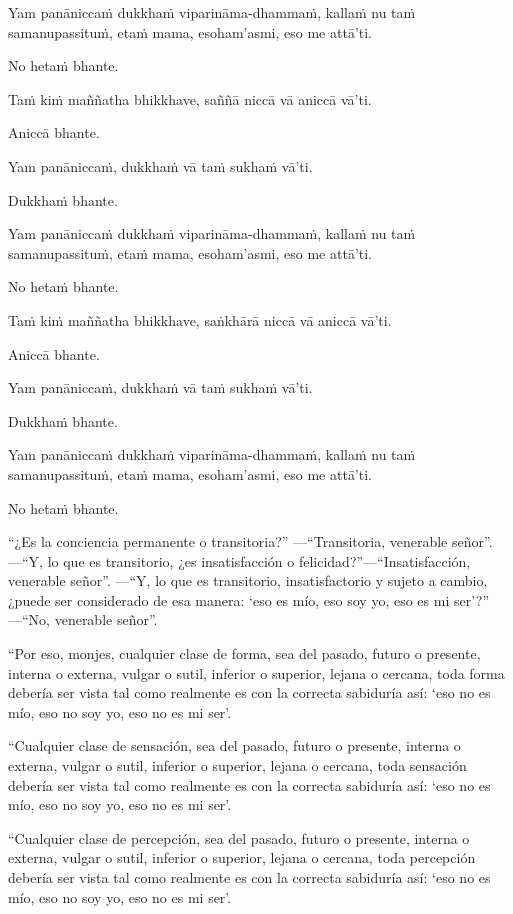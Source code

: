 Yam panāniccaṁ dukkhaṁ viparināma-dhammaṁ, kallaṁ nu taṁ samanupassituṁ,
etaṁ mama, esoham'asmi, eso me attā'ti.

No hetaṁ bhante.

Taṁ kiṁ maññatha bhikkhave, saññā niccā vā aniccā vā'ti.

Aniccā bhante.

Yam panāniccaṁ, dukkhaṁ vā taṁ sukhaṁ vā'ti.

Dukkhaṁ bhante.

Yam panāniccaṁ dukkhaṁ viparināma-dhammaṁ, kallaṁ nu taṁ samanupassituṁ,
etaṁ mama, esoham'asmi, eso me attā'ti.

No hetaṁ bhante.

Taṁ kiṁ maññatha bhikkhave, saṅkhārā niccā vā aniccā vā'ti.

Aniccā bhante.

Yam panāniccaṁ, dukkhaṁ vā taṁ sukhaṁ vā'ti.

Dukkhaṁ bhante.

Yam panāniccaṁ dukkhaṁ viparināma-dhammaṁ, kallaṁ nu taṁ samanupassituṁ,
etaṁ mama, esoham'asmi, eso me attā'ti.

No hetaṁ bhante.

\clearpage

\englishText
\markboth{\englishTitle}{\rightmark}

“¿Es la conciencia permanente o transitoria?”
—“Transitoria, venerable señor”.
—“Y, lo que es transitorio, ¿es insatisfacción o felicidad?”—“Insatisfacción, venerable señor”.
—“Y, lo que es transitorio, insatisfactorio y sujeto a cambio, ¿puede ser considerado de esa manera: ‘eso es mío, eso soy yo, eso es mi ser’?”
—“No, venerable señor”.

“Por eso, monjes, cualquier clase de forma, sea del pasado, futuro o presente, interna o externa, vulgar o sutil, inferior o superior, lejana o cercana, toda forma debería ser vista tal como realmente es con la correcta sabiduría así: ‘eso no es mío, eso no soy yo, eso no es mi ser’.

“Cualquier clase de sensación, sea del pasado, futuro o presente, interna o externa, vulgar o sutil, inferior o superior, lejana o cercana, toda sensación debería ser vista tal como realmente es con la correcta sabiduría así: ‘eso no es mío, eso no soy yo, eso no es mi ser’.

“Cualquier clase de percepción, sea del pasado, futuro o presente, interna o externa, vulgar o sutil, inferior o superior, lejana o cercana, toda percepción debería ser vista tal como realmente es con la correcta sabiduría así: ‘eso no es mío, eso no soy yo, eso no es mi ser’.


